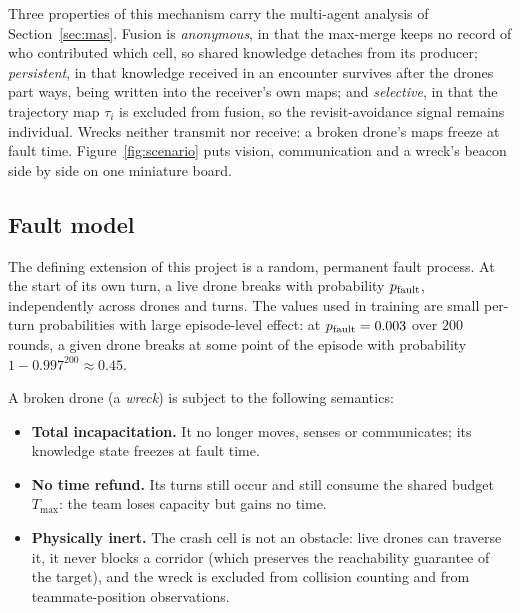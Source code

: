 Three properties of this mechanism carry the multi-agent analysis of
Section~\ref{sec:mas}. Fusion is \emph{anonymous}, in that the max-merge keeps no
record of who contributed which cell, so shared knowledge detaches from its
producer; \emph{persistent}, in that knowledge received in an encounter survives
after the drones part ways, being written into the receiver's own maps; and
\emph{selective}, in that the trajectory map $\tau_i$ is excluded from fusion, so
the revisit-avoidance signal remains individual. Wrecks neither transmit nor
receive: a broken drone's maps freeze at fault time.
Figure~\ref{fig:scenario} puts vision, communication and a wreck's beacon side
by side on one miniature board.

\subsection{Fault model}
\label{subsec:prob-fault}

The defining extension of this project is a random, permanent fault process. At
the start of its own turn, a live drone breaks with probability $p_{\mathrm{fault}}$,
independently across drones and turns. The values used in training are small
per-turn probabilities with large episode-level effect: at $p_{\mathrm{fault}} = 0.003$
over $200$ rounds, a given drone breaks at some point of the episode with
probability $1 - 0.997^{200} \approx 0.45$.

A broken drone (a \emph{wreck}) is subject to the following semantics:

\begin{itemize}[leftmargin=1.5em]
  \item \textbf{Total incapacitation.} It no longer moves, senses or
    communicates; its knowledge state freezes at fault time.
  \item \textbf{No time refund.} Its turns still occur and still consume the
    shared budget $T_{\max}$: the team loses capacity but gains no time.
  \item \textbf{Physically inert.} The crash cell is not an obstacle: live
    drones can traverse it, it never blocks a corridor (which preserves the
    reachability guarantee of the target), and the wreck is excluded from
    collision counting and from teammate-position observations.
\end{itemize}

